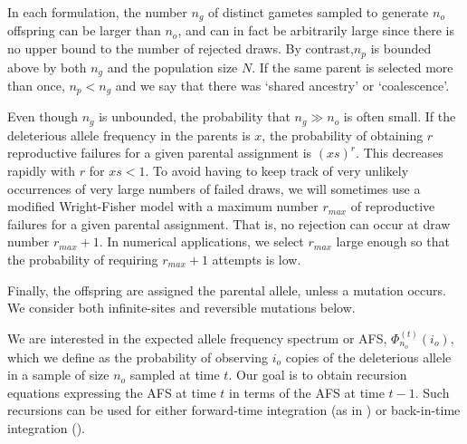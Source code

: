 \documentclass[9pt,twocolumn,twoside,lineno]{gsajnl}
\newcommand{\afs}[2]{\Phi_{#1}^{(#2)}}
\newcommand{\sgcomment}[1]{\textcolor{blue}{SG: #1}}
\begin{document}
 In each formulation, the number $n_g$ of distinct gametes sampled to generate $n_o$ offspring can be larger than $n_o$, and can in fact be arbitrarily large since there is no upper bound to the number of rejected draws. By contrast,$n_p$ is bounded above by both $n_g$ and the population size $N$.   If the same parent is selected more than once, $n_p< n_g$ and we say that there was `shared ancestry' or `coalescence'. 

Even though $n_g$ is unbounded, the probability that $n_g \gg n_o$ is often small. 
If the deleterious allele frequency in the parents is $x$, the probability of obtaining $r$ reproductive failures for a given parental assignment is $(xs)^r.$ This decreases rapidly with $r$ for $xs<1.$ To avoid having to keep track of very unlikely occurrences of very large numbers of failed draws, we will sometimes use a modified Wright-Fisher model with a maximum number $r_{max}$ of reproductive failures for a given parental assignment. That is, no rejection can occur at draw number $r_{max}+1.$  In numerical applications, we select $r_{max}$ large enough so that the probability of requiring $r_{max}+1$ attempts is low.    
 
Finally, the offspring are assigned the parental allele, unless a mutation occurs. We consider both infinite-sites and reversible mutations below.



We are interested in the expected allele frequency spectrum or AFS, $\afs{n_o}{t}(i_o),$ which we
define as the probability of observing $i_o$ copies of the deleterious allele in a sample of size $n_o$ sampled at time $t$. Our goal is to obtain recursion equations expressing the AFS at time $t$ in terms of the AFS at time $t-1$. Such recursions can be used for either forward-time integration (as in \cite{Jouganous}) or back-in-time integration (\cite{momi}). 
\end{document}
